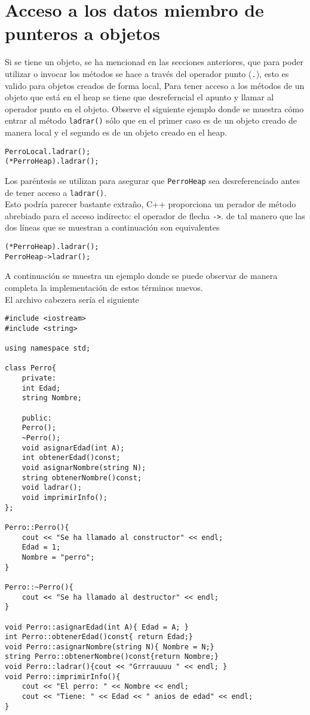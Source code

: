 \documentclass[12pt]{extarticle}
\newcommand{\<}{\langle}
\renewcommand{\>}{\rangle}
\theoremstyle{definition}
\begin{document}
\section{Acceso a los datos miembro de punteros a objetos}
Si se tiene un objeto, se ha mencionad en las secciones anteriores, que para poder utilizar o invocar los métodos se hace a través del operador punto (\verb|.|), esto es valido para objetos creados de forma local, Para tener acceso a los métodos de un objeto que está en el heap se tiene que desreferncial el apunto y llamar al operador punto en el objeto. Observe el siguiente ejemplo donde se muestra cómo entrar al método \verb|ladrar()| sólo que en el primer caso es de un objeto creado de manera local y el segundo es de un objeto creado en el heap.

\begin{lstlisting}
PerroLocal.ladrar();
(*PerroHeap).ladrar();
\end{lstlisting}

Los paréntesis se utilizan para asegurar que \verb|PerroHeap| sea desreferenciado antes de tener acceso a \verb|ladrar()|.\\

Esto podría parecer bastante extraño, C++ proporciona un perador de método abrebiado para el acceso indirecto: el operador de flecha \verb|->|. de tal manero que las dos líneas que se muestran a continuación son equivalentes

\begin{lstlisting}
(*PerroHeap).ladrar();
PerroHeap->ladrar();
\end{lstlisting}

A continuación se muestra un ejemplo donde se puede observar de manera completa la implementación de estos términos nuevos.\\

El archivo cabezera sería el siguiente 

\begin{lstlisting}
#include <iostream>
#include <string>

using namespace std;

class Perro{
	private:
	int Edad;
	string Nombre;
	
	public:
	Perro();
	~Perro();
	void asignarEdad(int A);
	int obtenerEdad()const;
	void asignarNombre(string N);
	string obtenerNombre()const;
	void ladrar();
	void imprimirInfo();
};

Perro::Perro(){
	cout << "Se ha llamado al constructor" << endl;
	Edad = 1;
	Nombre = "perro";
}

Perro::~Perro(){
	cout << "Se ha llamado al destructor" << endl; 
}

void Perro::asignarEdad(int A){ Edad = A; }
int Perro::obtenerEdad()const{ return Edad;}
void Perro::asignarNombre(string N){ Nombre = N;}
string Perro::obtenerNombre()const{return Nombre;}
void Perro::ladrar(){cout << "Grrrauuuu " << endl; }
void Perro::imprimirInfo(){
	cout << "El perro: " << Nombre << endl; 
	cout << "Tiene: " << Edad << " anios de edad" << endl;
}
\end{lstlisting}
\end{document}
